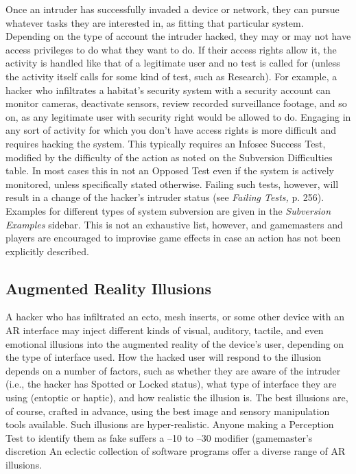 Once an intruder has successfully invaded a device 
or network, they can pursue whatever tasks they are 
interested in, as fitting that particular system. Depending
on the type of account the intruder hacked, they
may or may not have access privileges to do what 
they want to do. If their access rights allow it, the 
activity is handled like that of a legitimate user and 
no test is called for (unless the activity itself calls for 
some kind of test, such as Research). For example, a 
hacker who infiltrates a habitat's security system with 
a security account can monitor cameras, deactivate 
sensors, review recorded surveillance footage, and so 
on, as any legitimate user with security right would be 
allowed to do.
Engaging in any sort of activity for which you 
don't have access rights is more difficult and requires 
hacking the system. This typically requires an Infosec 
Success Test, modified by the difficulty of the action 
as noted on the Subversion Difficulties table. In most 
cases this in not an Opposed Test even if the system is 
actively monitored, unless specifically stated otherwise. 
Failing such tests, however, will result in a change of 
the hacker's intruder status (see \textit{Failing Tests,} p. 256).
Examples for different types of system subversion 
are given in the \textit{Subversion Examples} sidebar. This 
is not an exhaustive list, however, and gamemasters 
and players are encouraged to improvise game effects 
in case an action has not been explicitly described.

\subsection{Augmented Reality Illusions}

A hacker who has infiltrated an ecto, mesh inserts, or 
some other device with an AR interface may inject 
different kinds of visual, auditory, tactile, and even 
emotional illusions into the augmented reality of 
the device's user, depending on the type of interface 
used. How the hacked user will respond to the illusion
depends on a number of factors, such as whether
they are aware of the intruder (i.e., the hacker has 
Spotted or Locked status), what type of interface they 
are using (entoptic or haptic), and how realistic the 
illusion is.
The best illusions are, of course, crafted in advance, 
using the best image and sensory manipulation tools 
available. Such illusions are hyper-realistic. Anyone 
making a Perception Test to identify them as fake 
suffers a –10 to –30 modifier (gamemaster's discretion
An eclectic collection of software programs
offer a diverse range of AR illusions.

